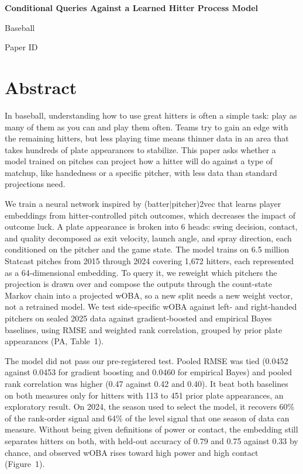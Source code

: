 \documentclass[11pt,letterpaper]{article}
\newcommand{\papertitle}{Conditional Queries Against a Learned Hitter Process Model}
\newcommand{\papertrack}{Baseball}  %
\newcommand{\paperid}{Paper ID}     %
\begin{document}
\raggedright
\thispagestyle{fancy}
\begin{center}
{\fontsize{18}{22}\selectfont\bfseries \papertitle\par}
\vspace{11pt}
{\fontsize{14}{17}\selectfont \papertrack\par \paperid\par}
\end{center}

\section*{Abstract}
In baseball, understanding how to use great hitters is often a simple task: play as many of them as you can and play them often. Teams try to gain an edge with the remaining hitters, but less playing time means thinner data in an area that takes hundreds of plate appearances to stabilize. This paper asks whether a model trained on pitches can project how a hitter will do against a type of matchup, like handedness or a specific pitcher, with less data than standard projections need.

We train a neural network inspired by (batter$|$pitcher)2vec that learns player embeddings from hitter-controlled pitch outcomes, which decreases the impact of outcome luck. A plate appearance is broken into 6 heads: swing decision, contact, and quality decomposed as exit velocity, launch angle, and spray direction, each conditioned on the pitcher and the game state. The model trains on 6.5 million Statcast pitches from 2015 through 2024 covering 1,672 hitters, each represented as a 64-dimensional embedding. To query it, we reweight which pitchers the projection is drawn over and compose the outputs through the count-state Markov chain into a projected wOBA, so a new split needs a new weight vector, not a retrained model. We test side-specific wOBA against left- and right-handed pitchers on sealed 2025 data against gradient-boosted and empirical Bayes baselines, using RMSE and weighted rank correlation, grouped by prior plate appearances (PA, Table~1).

The model did not pass our pre-registered test. Pooled RMSE was tied (0.0452 against 0.0453 for gradient boosting and 0.0460 for empirical Bayes) and pooled rank correlation was higher (0.47 against 0.42 and 0.40). It beat both baselines on both measures only for hitters with 113 to 451 prior plate appearances, an exploratory result. On 2024, the season used to select the model, it recovers 60\% of the rank-order signal and 64\% of the level signal that one season of data can measure. Without being given definitions of power or contact, the embedding still separates hitters on both, with held-out accuracy of 0.79 and 0.75 against 0.33 by chance, and observed wOBA rises toward high power and high contact (Figure~1).
\end{document}
